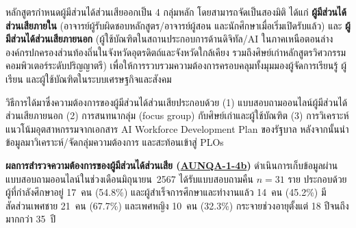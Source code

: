 
หลักสูตรกำหนดผู้มีส่วนได้ส่วนเสียออกเป็น 4 กลุ่มหลัก โดยสามารถจัดเป็นสองมิติ ได้แก่ \textbf{ผู้มีส่วนได้ส่วนเสียภายใน} (อาจารย์ผู้รับผิดชอบหลักสูตร/อาจารย์ผู้สอน และนักศึกษาเมื่อเริ่มเปิดรับแล้ว) และ \textbf{ผู้มีส่วนได้ส่วนเสียภายนอก} (ผู้ใช้บัณฑิตในสถานประกอบการด้านดิจิทัล/AI ในภาคเหนือตอนล่าง องค์กรปกครองส่วนท้องถิ่นในจังหวัดอุตรดิตถ์และจังหวัดใกล้เคียง รวมถึงศิษย์เก่าหลักสูตรวิศวกรรมคอมพิวเตอร์ระดับปริญญาตรี) เพื่อให้การรวบรวมความต้องการครอบคลุมทั้งมุมมองผู้จัดการเรียนรู้ ผู้เรียน และผู้ใช้บัณฑิตในระบบเศรษฐกิจและสังคม

วิธีการได้มาซึ่งความต้องการของผู้มีส่วนได้ส่วนเสียประกอบด้วย (1) แบบสอบถามออนไลน์ผู้มีส่วนได้ส่วนเสียภายนอก (2) การสนทนากลุ่ม (focus group) กับศิษย์เก่าและผู้ใช้บัณฑิต (3) การวิเคราะห์แนวโน้มอุตสาหกรรมจากเอกสาร AI Workforce Development Plan ของรัฐบาล หลังจากนั้นนำข้อมูลมาวิเคราะห์/จัดกลุ่มความต้องการ และสะท้อนเข้าสู่ PLOs

\textbf{ผลการสำรวจความต้องการของผู้มีส่วนได้ส่วนเสีย (\hyperlink{ref:AUNQA-1-4b}{AUNQA-1-4b})} ดำเนินการเก็บข้อมูลผ่านแบบสอบถามออนไลน์ในช่วงเดือนมิถุนายน~2567 ได้รับแบบสอบถามคืน $n = 31$ ราย ประกอบด้วยผู้ที่กำลังศึกษาอยู่ 17~คน (54.8\%) และผู้สำเร็จการศึกษาและทำงานแล้ว 14~คน (45.2\%) มีสัดส่วนเพศชาย 21~คน (67.7\%) และเพศหญิง 10~คน (32.3\%) กระจายช่วงอายุตั้งแต่ 18 ปีจนถึงมากกว่า 35~ปี

